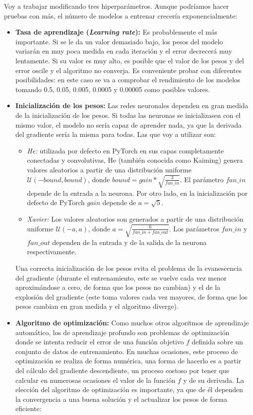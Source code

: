 Voy a trabajar modificando tres hiperparámetros. Aunque podríamos hacer pruebas con más, el número de modelos a entrenar crecería exponencialmente:
\begin{itemize}
    \item \textbf{Tasa de aprendizaje (\textit{Learning rate}):} Es probablemente el más importante. Si se le da un valor demasiado bajo, los pesos del modelo variarán en muy poca medida en cada iteración y el error decrecerá muy lentamente. Si su valor es muy alto, es posible que el valor de los pesos y del error oscile y el algoritmo no converja. Es conveniente probar con diferentes posibilidades: en este caso se va a comprobar el rendimiento de los modelos tomando 0.5, 0.05, 0.005, 0.0005 y 0.00005 como posibles valores. \cite{berzal2018redes}
    \item \textbf{Inicialización de los pesos:} Las redes neuronales dependen en gran medida de la inicialización de los pesos. Si todas las neuronas se inicializasen con el mismo valor, el modelo no sería capaz de aprender nada, ya que la derivada del gradiente sería la misma para todas. Las que voy a utilizar son: \cite{pytorch-doc}
    \begin{itemize}
        \item \textit{He:} utilizada por defecto en PyTorch en sus capas completamente conectadas y convolutivas, He (también conocida como Kaiming) genera valores aleatorios a partir de una distribución uniforme $\mathcal{U}(-bound, bound)$, donde $bound = gain * \sqrt{\frac{3}{fan\_in}}$. El parámetro $fan\_in$ depende de la entrada a la neurona. Por otro lado, en la inicialización por defecto de PyTorch $gain$ depende de $a = \sqrt{5}$.
        \item \textit{Xavier:} Los valores aleatorios son generados a partir de una distribución uniforme $\mathcal{U}(-a, a)$, donde $a = \sqrt{\frac{6}{fan\_in + fan\_out}}$. Los parámetros $fan\_in$ y $fan\_out$ dependen de la entrada y de la salida de la neurona respectivamente.
    \end{itemize}
    Una correcta inicialización de los pesos evita el problema de la evanescencia del gradiente (durante el entrenamiento, este se vuelve cada vez menor aproximándose a cero, de forma que los pesos no cambian) y el de la explosión del gradiente (este toma valores cada vez mayores, de forma que los pesos cambian en gran medida y el algoritmo diverge).
    \item \textbf{Algoritmo de optimización:} Como muchos otros algoritmos de aprendizaje automático, los de aprendizaje profundo son problemas de optimización donde se intenta reducir el error de una función objetivo $f$ definida sobre un conjunto de datos de entrenamiento. En muchas ocasiones, este proceso de optimización se realiza de forma numérica, una forma de hacerlo es a partir del cálculo del gradiente descendiente, un proceso costoso por tener que calcular en numerosas ocasiones el valor de la función $f$ y de su derivada. La elección del algoritmo de optimización es importante, ya que de él dependen la convergencia a una buena solución y el actualizar los pesos de forma eficiente: \cite{berzal2018redes}

\end{itemize}
